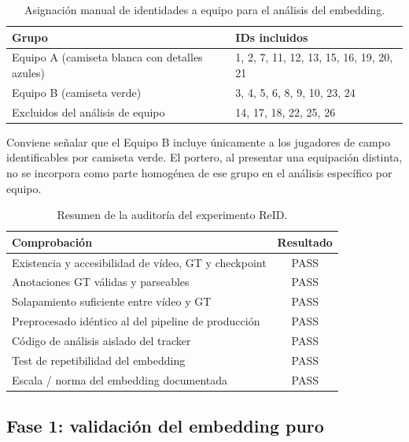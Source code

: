 \documentclass[../MAIN.tex]{subfiles}
\begin{document}
	\begin{table}[H]
		\centering
		\caption{Asignación manual de identidades a equipo para el análisis del embedding.}
		\label{tab:cap8_asignacion_equipos}
		\begin{tabular}{p{3.2cm}p{10.2cm}}
			\toprule
			\textbf{Grupo} & \textbf{IDs incluidos} \\
			\midrule
			Equipo A (camiseta blanca con detalles azules) & 1, 2, 7, 11, 12, 13, 15, 16, 19, 20, 21 \\
			Equipo B (camiseta verde) & 3, 4, 5, 6, 8, 9, 10, 23, 24 \\
			Excluidos del análisis de equipo & 14, 17, 18, 22, 25, 26 \\
			\bottomrule
		\end{tabular}
	\end{table}
	
	Conviene señalar que el Equipo B incluye únicamente a los jugadores de campo identificables por camiseta verde. El portero, al presentar una equipación distinta, no se incorpora como parte homogénea de ese grupo en el análisis específico por equipo.
	
	\begin{table}[H]
		\centering
		\caption{Resumen de la auditoría del experimento ReID.}
		\label{tab:cap8_auditoria}
		\begin{tabular}{p{8.5cm}c}
			\toprule
			\textbf{Comprobación} & \textbf{Resultado} \\
			\midrule
			Existencia y accesibilidad de vídeo, GT y checkpoint & PASS \\
			Anotaciones GT válidas y parseables & PASS \\
			Solapamiento suficiente entre vídeo y GT & PASS \\
			Preprocesado idéntico al del pipeline de producción & PASS \\
			Código de análisis aislado del tracker & PASS \\
			Test de repetibilidad del embedding & PASS \\
			Escala / norma del embedding documentada & PASS \\
			\bottomrule
		\end{tabular}
	\end{table}
	
	\subsection{Fase 1: validación del embedding puro}
	
\end{document}
